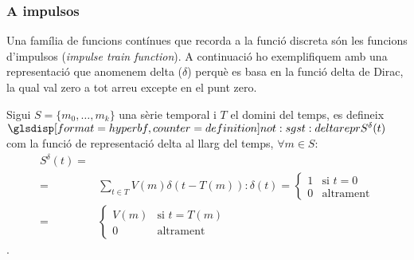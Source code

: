 \subsubsection{A impulsos}


Una família de funcions contínues que recorda a la funció discreta són
les funcions d'impulsos (\emph{impulse train function}).  A
continuació ho exemplifiquem amb una representació que anomenem delta
($\delta$) perquè es basa en la funció delta de Dirac, la qual val
zero a tot arreu excepte en el punt zero.

\begin{definition}
  Sigui $S=\{m_0,\ldots,m_k\}$ una sèrie temporal i $T$ el domini del
  temps, es defineix $\glsdispdef{not:sgst:deltarepr}{S^\delta(t)}$ com la
  funció de representació delta al llarg del temps, $\forall m \in S:$
  \begin{align*}
    S^\delta(t) = &  \\
    = & \sum_{t\in T} V(m) \delta(t-T(m)): \delta(t)= 
      \begin{cases}
        1 & \text{si }  t=0 \\
        0 & \text{altrament}
      \end{cases} \\
    = & \begin{cases}
      V(m) & \text{si }  t=T(m) \\
      0 & \text{altrament}
    \end{cases}
         \end{align*}.
\end{definition}



